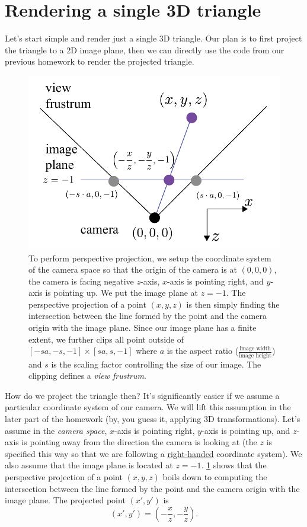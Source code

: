 \section{Rendering a single 3D triangle}
Let's start simple and render just a single 3D triangle. Our plan is to first project the triangle to a 2D image plane, then we can directly use the code from our previous homework to render the projected triangle.

\begin{figure}[h]
    \centering
    \includegraphics[width=0.5\linewidth]{imgs/perspective_transform.pdf}
    \caption{To perform perspective projection, we setup the coordinate system of the camera space so that the origin of the camera is at $(0, 0, 0)$, the camera is facing negative $z$-axis, $x$-axis is pointing right, and $y$-axis is pointing up. We put the image plane at $z=-1$. The perspective projection of a point $(x, y, z)$ is then simply finding the intersection between the line formed by the point and the camera origin with the image plane. Since our image plane has a finite extent, we further clips all point outside of $[-sa, -s, -1] \times [sa, s, -1]$ where $a$ is the aspect ratio ($\frac{\text{image width}}{\text{image height}}$) and $s$ is the scaling factor controlling the size of our image. The clipping defines a \emph{view frustrum}.}
    \label{fig:perspective_transform}
\end{figure}

How do we project the triangle then? It's significantly easier if we assume a particular coordinate system of our camera. We will lift this assumption in the later part of the homework (by, you guess it, applying 3D transformations). Let's assume in the \emph{camera space}, $x$-axis is pointing right, $y$-axis is pointing up, and $z$-axis is pointing away from the direction the camera is looking at (the $z$ is specified this way so that we are following a \href{https://en.wikipedia.org/wiki/Right-hand_rule}{right-handed} coordinate system). We also assume that the image plane is located at $z=-1$. \cref{fig:perspective_transform} shows that the perspective projection of a point $(x, y, z)$ boils down to computing the intersection between the line formed by the point and the camera origin with the image plane. The projected point $(x', y')$ is
\begin{equation}
\left(x', y'\right) = \left(-\frac{x}{z}, -\frac{y}{z}\right).
\label{eq:projection}
\end{equation}

